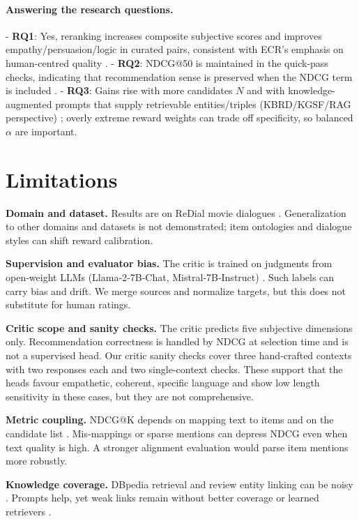 \documentclass[12pt]{article}
\begin{document}
  \paragraph{Answering the research questions.}
  - \textbf{RQ1}: Yes, reranking increases composite subjective scores and improves empathy/persuasion/logic in curated pairs, consistent with ECR's emphasis on human-centred quality \citep{zhang2024ecr}.
  - \textbf{RQ2}: NDCG@50 is maintained in the quick-pass checks, indicating that recommendation sense is preserved when the NDCG term is included \citep{evidently_ndcg}.
  - \textbf{RQ3}: Gains rise with more candidates $N$ and with knowledge-augmented prompts that supply retrievable entities/triples (KBRD/KGSF/RAG perspective) \citep{chen2020kbrd,zhou2020kgsf,lewis2020rag}; overly extreme reward weights can trade off specificity, so balanced \(\alpha\) are important.
  
  \section{Limitations}
  \textbf{Domain and dataset.} Results are on ReDial movie dialogues \citep{charlin2018redial}. Generalization to other domains and datasets is not demonstrated; item ontologies and dialogue styles can shift reward calibration.
  
  \textbf{Supervision and evaluator bias.} The critic is trained on judgments from open‑weight LLMs (Llama‑2‑7B‑Chat, Mistral‑7B‑Instruct) \citep{meta2023llama2,mistral2023}. Such labels can carry bias and drift. We merge sources and normalize targets, but this does not substitute for human ratings.
  
  \textbf{Critic scope and sanity checks.} The critic predicts five subjective dimensions only. Recommendation correctness is handled by NDCG at selection time and is not a supervised head. Our critic sanity checks cover three hand‑crafted contexts with two responses each and two single‑context checks. These support that the heads favour empathetic, coherent, specific language and show low length sensitivity in these cases, but they are not comprehensive.
  
  \textbf{Metric coupling.} NDCG@K depends on mapping text to items and on the candidate list \citep{evidently_ndcg}. Mis‑mappings or sparse mentions can depress NDCG even when text quality is high. A stronger alignment evaluation would parse item mentions more robustly.
  
  \textbf{Knowledge coverage.} DBpedia retrieval and review entity linking can be noisy \citep{dbpedia_wikipedia}. Prompts help, yet weak links remain without better coverage or learned retrievers \citep{lewis2020rag}.
  
\end{document}
